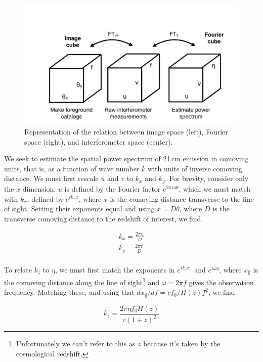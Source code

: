 {\begin{figure}[h]
    \centering
    \includegraphics[width=1\textwidth]{chap0_intro/ifo_space.pdf}
    \caption{Representation of the relation between image space (left), Fourier space (right), and interferometer space (center).}
    \label{fig:ifospace}
\end{figure}

We seek to estimate the spatial power spectrum of 21\,cm emission in comoving units, that is, as a function of wave number $k$ with units of inverse comoving distance. We must first rescale $u$ and $v$ to $k_x$ and $k_y$. For brevity, consider only the $x$ dimension. $u$ is defined by the Fourier factor $e^{2\pi i u\theta}$, which we must match with $k_x$, defined by $e^{ik_x x}$, where $x$ is the comoving distance transverse to the line of sight. Setting their exponents equal and using $x=D\theta$, where $D$ is the transverse comoving distance to the redshift of interest, we find.

\begin{eqnarray}
	k_x=\frac{2\pi u}{D} \\ 
	k_y=\frac{2\pi v}{D} \\ 
\end{eqnarray}

To relate $k_z$ to $\eta$, we must first match the exponents in $e^{i k_z x_\parallel}$ and $e^{i\omega \eta}$, where $x_\parallel$ is the comoving distance along the line of sight\footnote{Unfortunately we can't refer to this as $z$ because it's taken by the cosmological redshift.} and $\omega=2\pi f$ gives the observation frequency. Matching these, and using that $d x_\parallel/df=cf_0/H(z)f^2$, we find

\begin{equation}
	k_z=\frac{2\pi\eta f_0 H(z)}{c(1+z)^2}
\end{equation}

}

